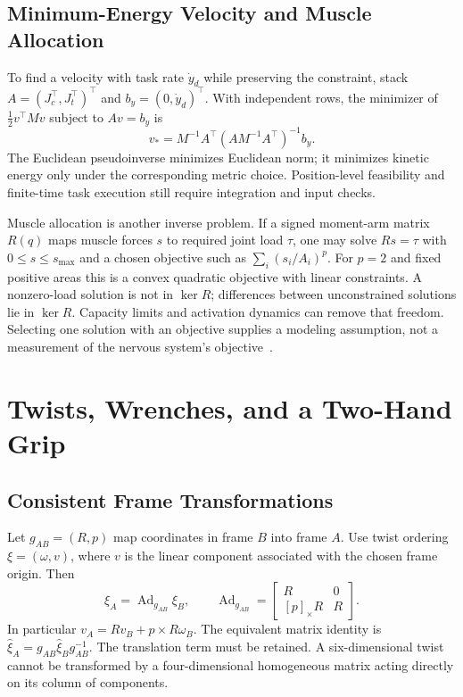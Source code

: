 \subsection{Minimum-Energy Velocity and Muscle Allocation}

To find a velocity with task rate $\dot y_d$ while preserving the constraint, stack $A=(J_c^\top,J_t^\top)^\top$ and $b_y=(0,\dot y_d)^\top$. With independent rows, the minimizer of $\tfrac12v^\top Mv$ subject to $Av=b_y$ is
\begin{equation}
 v_*=M^{-1}A^\top(AM^{-1}A^\top)^{-1}b_y.
\end{equation}
The Euclidean pseudoinverse minimizes Euclidean norm; it minimizes kinetic energy only under the corresponding metric choice. Position-level feasibility and finite-time task execution still require integration and input checks.

Muscle allocation is another inverse problem. If a signed moment-arm matrix $R(q)$ maps muscle forces $s$ to required joint load $\tau$, one may solve $Rs=\tau$ with $0\le s\le s_{\max}$ and a chosen objective such as $\sum_i(s_i/A_i)^p$. For $p=2$ and fixed positive areas this is a convex quadratic objective with linear constraints. A nonzero-load solution is not in $\ker R$; differences between unconstrained solutions lie in $\ker R$. Capacity limits and activation dynamics can remove that freedom. Selecting one solution with an objective supplies a modeling assumption, not a measurement of the nervous system's objective~\cite{Zajac1989}.

\section{Twists, Wrenches, and a Two-Hand Grip}
\label{sec:ch9:screw-theory}

\subsection{Consistent Frame Transformations}

Let $g_{AB}=(R,p)$ map coordinates in frame $B$ into frame $A$. Use twist ordering $\xi=(\omega,v)$, where $v$ is the linear component associated with the chosen frame origin. Then
\begin{equation}
 \xi_A=\operatorname{Ad}_{g_{AB}}\xi_B,\qquad
 \operatorname{Ad}_{g_{AB}}=\begin{bmatrix}R&0\\{}[p]_\times R&R\end{bmatrix}.
\end{equation}
In particular $v_A=Rv_B+p\times R\omega_B$. The equivalent matrix identity is $\widehat\xi_A=g_{AB}\widehat\xi_Bg_{AB}^{-1}$. The translation term must be retained. A six-dimensional twist cannot be transformed by a four-dimensional homogeneous matrix acting directly on its column of components.


